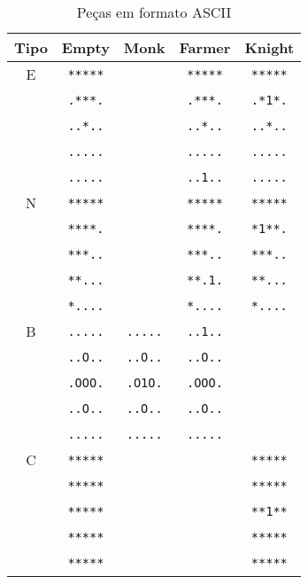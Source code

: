 \begin{table}[H]
\centering 
\begin{tabular}{| c | c | c | c | c |}
\hline
Tipo & Empty & Monk & Farmer & Knight \\ 
\hline
E  &  \texttt{*****} &   ~     &  \texttt{*****}  & \texttt{*****} \\ 
   &  \texttt{.***.} &   ~     &  \texttt{.***.}  & \texttt{.*1*.} \\ 
   &  \texttt{..*..} &   ~     &  \texttt{..*..}  & \texttt{..*..} \\ 
   &  \texttt{.....} &   ~     &  \texttt{.....}  & \texttt{.....} \\
   &  \texttt{.....} &   ~     &  \texttt{..1..}  & \texttt{.....} \\
\hline
N  &  \texttt{*****} &   ~     &  \texttt{*****}  & \texttt{*****} \\ 
   &  \texttt{****.} &   ~     &  \texttt{****.}  & \texttt{*1**.} \\ 
   &  \texttt{***..} &   ~     &  \texttt{***..}  & \texttt{***..} \\ 
   &  \texttt{**...} &   ~     &  \texttt{**.1.}  & \texttt{**...} \\ 
   &  \texttt{*....} &   ~     &  \texttt{*....}  & \texttt{*....} \\ 
\hline
B  &  \texttt{.....} &  \texttt{.....} &   \texttt{..1..} &    ~     \\   
   &  \texttt{..O..} &  \texttt{..O..} &   \texttt{..O..} &    ~     \\ 
   &  \texttt{.OOO.} &  \texttt{.O1O.} &   \texttt{.OOO.} &    ~     \\ 
   &  \texttt{..O..} &  \texttt{..O..} &   \texttt{..O..} &    ~     \\ 
   &  \texttt{.....} &  \texttt{.....} &   \texttt{.....} &    ~     \\ 
\hline
C  &  \texttt{*****} &   ~     &     ~     & \texttt{*****} \\ 
   &  \texttt{*****} &   ~     &     ~     & \texttt{*****} \\ 
   &  \texttt{*****} &   ~     &     ~     & \texttt{**1**} \\ 
   &  \texttt{*****} &   ~     &     ~     & \texttt{*****} \\ 
   &  \texttt{*****} &   ~     &     ~     & \texttt{*****} \\ 
\hline
\end{tabular}
\caption{Peças em formato ASCII}
\end{table}

